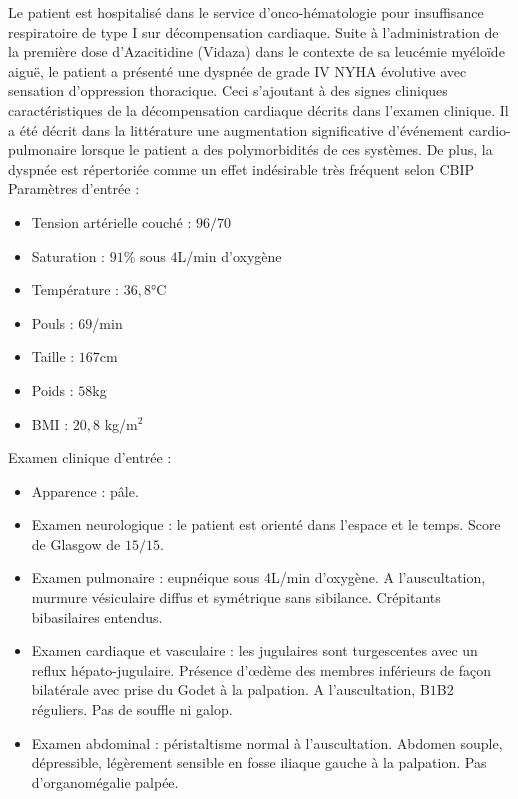 Le patient est hospitalisé dans le service d’onco-hématologie pour insuffisance respiratoire de type I sur décompensation cardiaque. Suite à l’administration de la première dose d’Azacitidine (Vidaza) dans le contexte de sa leucémie myéloïde aiguë, le patient a présenté une dyspnée de grade IV NYHA évolutive avec sensation d’oppression thoracique. Ceci s’ajoutant à des signes cliniques caractéristiques de la décompensation cardiaque décrits dans l’examen clinique. Il a été décrit dans la littérature une augmentation significative d’événement cardio-pulmonaire lorsque le patient a des polymorbidités de ces systèmes. De plus, la dyspnée est répertoriée comme un effet indésirable très fréquent selon CBIP 
Paramètres d’entrée :
\begin{itemize}[label=\textbullet]
    \item Tension artérielle couché : $96/70$
    \item Saturation : $91$\% sous $4$L/min d’oxygène
    \item Température : $36,8$°C
    \item Pouls : $69$/min
    \item Taille : $167$cm
    \item Poids : $58$kg
    \item BMI : $20,8$ kg/m$^2$
    \end{itemize}
Examen clinique d’entrée :
    \begin{itemize}[label=\textbullet]
    \item Apparence : pâle.
    \item Examen neurologique : le patient est orienté dans l’espace et le temps. Score de Glasgow de $15/15$.
    \item Examen pulmonaire : eupnéique sous 4L/min d’oxygène. A l’auscultation, murmure vésiculaire diffus et symétrique sans sibilance. Crépitants bibasilaires entendus.
    \item Examen cardiaque et vasculaire : les jugulaires sont turgescentes avec un reflux hépato-jugulaire. Présence d’œdème des membres inférieurs de façon bilatérale avec prise du Godet à la palpation. A l’auscultation, B$1$B$2$ réguliers. Pas de souffle ni galop.
    \item Examen abdominal : péristaltisme normal à l’auscultation. Abdomen souple, dépressible, légèrement sensible en fosse iliaque gauche à la palpation. Pas d’organomégalie palpée.
    \end{itemize}

